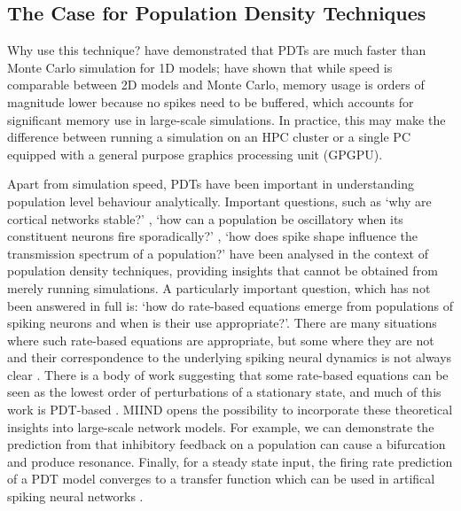 \documentclass[utf8]{frontiersSCNS} %
\begin{document}
\subsection{The Case for Population Density Techniques} 
Why use this technique?
\cite{omurtag2000,nykamp2000population,kamps2003simple,iyer2013influence} have demonstrated that PDTs are much faster than Monte Carlo simulation for 1D models; \cite{de2019computational} have shown that while speed is comparable between 2D models and Monte Carlo, memory usage is orders of magnitude lower because no spikes need to be buffered, which accounts for significant memory use in large-scale simulations. In practice, this may make the difference between running a simulation on an HPC cluster or a single PC equipped with a general purpose graphics processing unit (GPGPU).

Apart from simulation speed, PDTs have been important in understanding population level behaviour analytically. Important questions, such as `why are cortical networks stable?' \citep{amit1997model}, `how can a population be oscillatory when its constituent neurons fire sporadically?'
\citep{brunel1999fast}, `how does spike shape influence the transmission spectrum of a population?'\citep{fourcaud2003spike} have been analysed in the context of population density techniques, providing insights that cannot be obtained from merely running simulations. A particularly important question, which has not been answered in full is: `how do rate-based equations emerge from populations of spiking neurons and when is their use appropriate?'. There are many situations where such rate-based equations are appropriate, but some where they are not and their correspondence to the underlying spiking neural dynamics is not always clear \citep{montbrio2015macroscopic,de2013generic}. There is a body of work suggesting that some rate-based equations can be seen as the lowest order of perturbations of a stationary state, and much of this work is PDT-based \citep{wilson1972excitatory,gerstner1998spiking,mattia2002population,mattia2004finite,montbrio2015macroscopic}. MIIND opens the possibility to incorporate these theoretical insights into large-scale network models. For example, we can demonstrate the prediction from \cite{brunel1999fast} that inhibitory feedback on a population can cause a bifurcation and produce resonance. Finally, for a steady state input, the firing rate prediction of a PDT model converges to a transfer function which can be used in artifical spiking neural networks \citep{de2008state}.
\end{document}
